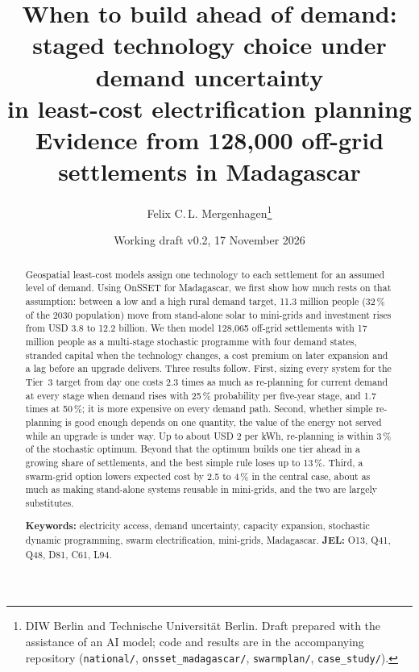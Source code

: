 \documentclass[11pt,a4paper]{article}
\title{When to build ahead of demand:\\ staged technology choice under demand uncertainty\\ in least-cost electrification planning\\[4pt]
\large Evidence from 128,000 off-grid settlements in Madagascar}
\author{Felix C.\,L. Mergenhagen\thanks{DIW Berlin and Technische Universit\"at Berlin. Draft prepared with the
assistance of an AI model; code and results are in the accompanying repository
(\texttt{national/}, \texttt{onsset\_madagascar/}, \texttt{swarmplan/}, \texttt{case\_study/}).}}
\date{Working draft v0.2, 17 November 2026}
\begin{document}
\maketitle
\vspace{-1.2em}
\begin{center}
\end{center}

\begin{abstract}
\noindent Geospatial least-cost models assign one technology to each settlement for an assumed level of demand.
Using OnSSET for Madagascar, we first show how much rests on that assumption: between a low and a high rural demand
target, 11.3 million people (32\,\% of the 2030 population) move from stand-alone solar to mini-grids and
investment rises from USD 3.8 to 12.2 billion. We then model 128,065 off-grid settlements with 17 million people as
a multi-stage stochastic programme with four demand states, stranded capital when the technology changes, a cost
premium on later expansion and a lag before an upgrade delivers. Three results follow. First, sizing every system
for the Tier~3 target from day one costs 2.3 times as much as re-planning for current demand at every stage when
demand rises with 25\,\% probability per five-year stage, and 1.7 times at 50\,\%; it is more expensive on every
demand path. Second, whether simple re-planning is good enough depends on one quantity, the value of the energy not
served while an upgrade is under way. Up to about USD 2 per kWh, re-planning is within 3\,\% of the stochastic
optimum. Beyond that the optimum builds one tier ahead in a growing share of settlements, and the best simple rule
loses up to 13\,\%. Third, a swarm-grid option
lowers expected cost by 2.5 to 4\,\% in the central case, about as much as making stand-alone systems reusable in
mini-grids, and the two are largely substitutes.

\medskip\noindent\textbf{Keywords:} electricity access, demand uncertainty, capacity expansion, stochastic dynamic
programming, swarm electrification, mini-grids, Madagascar. \quad \textbf{JEL:} O13, Q41, Q48, D81, C61, L94.
\end{abstract}
\end{document}
